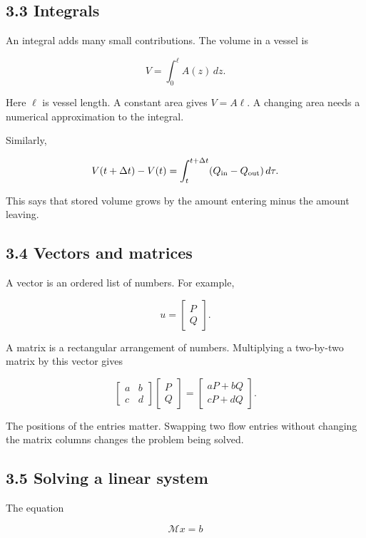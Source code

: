 \documentclass[11pt,a4paper]{article}
\begin{document}
\subsection{3.3 Integrals}
An integral adds many small contributions. The volume in a vessel is


\begingroup\small
\[
V=\int_0^\ell A(z)\,dz.
\]
\endgroup


Here \(\ell\) is vessel length. A constant area gives \(V=A\ell\). A changing area needs a numerical approximation to the integral.

Similarly,


\begingroup\small
\[
V(t+\Delta t)-V(t)
=\int_t^{t+\Delta t}(Q_{\rm in}-Q_{\rm out})\,d\tau.
\]
\endgroup


This says that stored volume grows by the amount entering minus the amount leaving.

\subsection{3.4 Vectors and matrices}
A vector is an ordered list of numbers. For example,


\begingroup\small
\[
u=\begin{bmatrix}P\\Q\end{bmatrix}.
\]
\endgroup


A matrix is a rectangular arrangement of numbers. Multiplying a two-by-two matrix by this vector gives


\begingroup\small
\[
\begin{bmatrix}a&b\\c&d\end{bmatrix}
\begin{bmatrix}P\\Q\end{bmatrix}
=
\begin{bmatrix}aP+bQ\\cP+dQ\end{bmatrix}.
\]
\endgroup


The positions of the entries matter. Swapping two flow entries without changing the matrix columns changes the problem being solved.

\subsection{3.5 Solving a linear system}
The equation


\begingroup\small
\[
\mathcal Mx=b
\]
\endgroup
\end{document}

